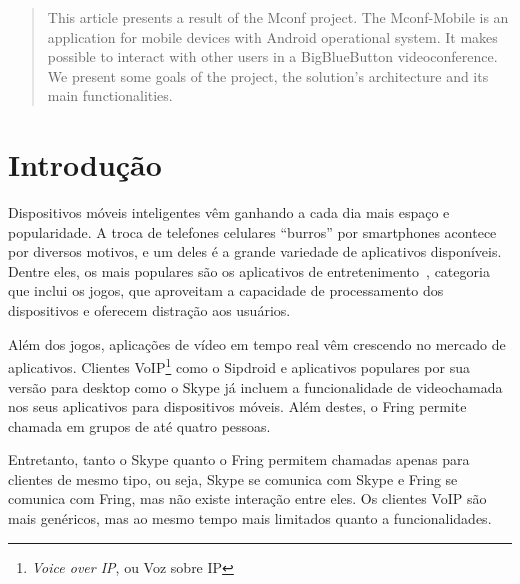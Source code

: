 \documentclass{acm_proc_article-sp}
\begin{document}
\begin{abstract}
  This article presents a result of the Mconf project. The Mconf-Mobile is an application for mobile devices with Android operational system. It makes possible to interact with other users in a BigBlueButton videoconference. We present some goals of the project, the solution's architecture and its main functionalities.
\end{abstract}






\section{Introdução}

Dispositivos móveis inteligentes vêm ganhando a cada dia mais espaço e popularidade. A troca de telefones celulares ``burros'' por smartphones acontece por diversos motivos, e um deles é a grande variedade de aplicativos disponíveis. Dentre eles, os mais populares são os aplicativos de entretenimento~\cite{android-stats}, categoria que inclui os jogos, que aproveitam a capacidade de processamento dos dispositivos e oferecem distração aos usuários.

Além dos jogos, aplicações de vídeo em tempo real vêm crescendo no mercado de aplicativos. Clientes VoIP\footnote{\emph{Voice over IP}, ou Voz sobre IP} como o Sipdroid e aplicativos populares por sua versão para desktop como o Skype já incluem a funcionalidade de videochamada nos seus aplicativos para dispositivos móveis. Além destes, o Fring permite chamada em grupos de até quatro pessoas.

Entretanto, tanto o Skype quanto o Fring permitem chamadas apenas para clientes de mesmo tipo, ou seja, Skype se comunica com Skype e Fring se comunica com Fring, mas não existe interação entre eles. Os clientes VoIP são mais genéricos, mas ao mesmo tempo mais limitados quanto a funcionalidades.
\end{document}

